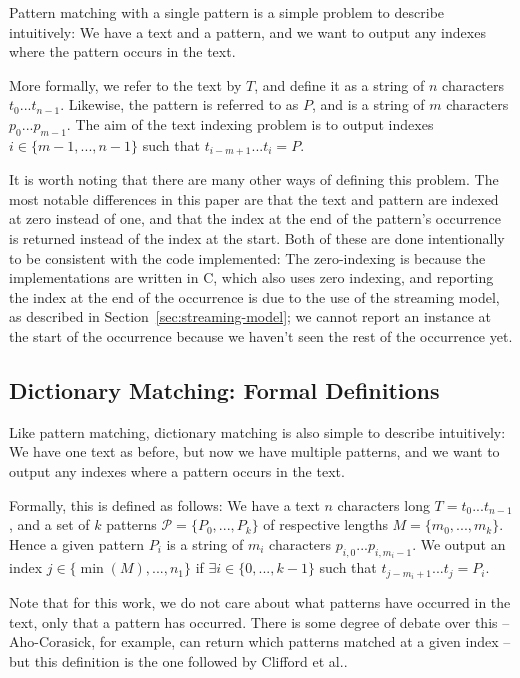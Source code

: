 \documentclass[ %
                    author={Dominic Joseph Moylett},
                    degree={MEng},
                     title={Dictionary Matching with Fingerprints},
                  subtitle={An Empirical Analysis},
                      type={research},
                      year={2015} ]{dissertation}
\begin{document}
Pattern matching with a single pattern is a simple problem to describe intuitively: We have a text and a pattern, and we want to output any indexes where the pattern occurs in the text.

More formally, we refer to the text by $T$, and define it as a string of $n$ characters $t_0...t_{n-1}$. Likewise, the pattern is referred to as $P$, and is a string of $m$ characters $p_0...p_{m-1}$. The aim of the text indexing problem is to output indexes $i \in \{m-1,...,n-1\}$ such that $t_{i-m+1}...t_{i} = P$.

It is worth noting that there are many other ways of defining this problem. The most notable differences in this paper are that the text and pattern are indexed at zero instead of one, and that the index at the end of the pattern's occurrence is returned instead of the index at the start. Both of these are done intentionally to be consistent with the code implemented: The zero-indexing is because the implementations are written in C, which also uses zero indexing, and reporting the index at the end of the occurrence is due to the use of the streaming model, as described in Section~\ref{sec:streaming-model}; we cannot report an instance at the start of the occurrence because we haven't seen the rest of the occurrence yet.

\subsection{Dictionary Matching: Formal Definitions}
\label{ssec:dict-matching:definitions}

Like pattern matching, dictionary matching is also simple to describe intuitively: We have one text as before, but now we have multiple patterns, and we want to output any indexes where a pattern occurs in the text.

Formally, this is defined as follows: We have a text $n$ characters long $T = t_0...t_{n-1}$, and a set of $k$ patterns $\mathcal{P} = \{P_0,...,P_k\}$ of respective lengths $M = \{m_0,...,m_k\}$. Hence a given pattern $P_i$ is a string of $m_i$ characters $p_{i,0}...p_{i,m_i-1}$. We output an index $j \in \{\min(M),...,n_1\}$ if $\exists i \in \{0,...,k-1\}$ such that $t_{j-m_i+1}...t_{j} = P_i$.

Note that for this work, we do not care about what patterns have occurred in the text, only that a pattern has occurred. There is some degree of debate over this -- Aho-Corasick, for example, can return which patterns matched at a given index -- but this definition is the one followed by Clifford et al.\@ \cite{2015arXiv150406242C}.
\end{document}
